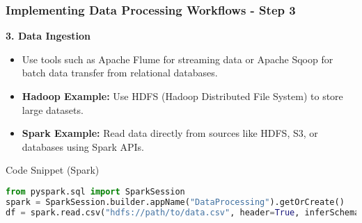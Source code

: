 \documentclass[aspectratio=169]{beamer}
\begin{document}
\begin{frame}[fragile]
    \frametitle{Implementing Data Processing Workflows - Step 3}
    \textbf{3. Data Ingestion}
    \begin{itemize}
        \item Use tools such as Apache Flume for streaming data or Apache Sqoop for batch data transfer from relational databases.
        \item \textbf{Hadoop Example:} Use HDFS (Hadoop Distributed File System) to store large datasets.
        \item \textbf{Spark Example:} Read data directly from sources like HDFS, S3, or databases using Spark APIs.
    \end{itemize}

    \begin{block}{Code Snippet (Spark)}
    \begin{lstlisting}[language=python]
from pyspark.sql import SparkSession
spark = SparkSession.builder.appName("DataProcessing").getOrCreate()
df = spark.read.csv("hdfs://path/to/data.csv", header=True, inferSchema=True)
    \end{lstlisting}
    \end{block}
\end{frame}
\end{document}
